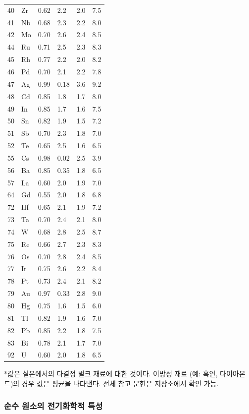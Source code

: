 \documentclass[12pt,a4paper]{article}
\begin{document}
\begin{longtable}{p{0.8cm}p{1.2cm}p{2.2cm}p{2.2cm}p{2.2cm}p{2.2cm}}
		40 & Zr & 0.62 & 2.2 & 2.0 & 7.5 \\
		41 & Nb & 0.68 & 2.3 & 2.2 & 8.0 \\
		42 & Mo & 0.70 & 2.6 & 2.4 & 8.5 \\
		44 & Ru & 0.71 & 2.5 & 2.3 & 8.3 \\
		45 & Rh & 0.77 & 2.2 & 2.0 & 8.2 \\
		46 & Pd & 0.70 & 2.1 & 2.2 & 7.8 \\
		47 & Ag & 0.99 & 0.18 & 3.6 & 9.2 \\
		48 & Cd & 0.85 & 1.8 & 1.7 & 8.0 \\
		49 & In & 0.85 & 1.7 & 1.6 & 7.5 \\
		50 & Sn & 0.82 & 1.9 & 1.5 & 7.2 \\
		51 & Sb & 0.70 & 2.3 & 1.8 & 7.0 \\
		52 & Te & 0.65 & 2.5 & 1.6 & 6.5 \\
		55 & Cs & 0.98 & 0.02 & 2.5 & 3.9 \\
		56 & Ba & 0.85 & 0.35 & 1.8 & 6.5 \\
		57 & La & 0.60 & 2.0 & 1.9 & 7.0 \\
		64 & Gd & 0.55 & 2.0 & 1.8 & 6.8 \\
		72 & Hf & 0.65 & 2.1 & 1.9 & 7.2 \\
		73 & Ta & 0.70 & 2.4 & 2.1 & 8.0 \\
		74 & W  & 0.68 & 2.8 & 2.5 & 8.7 \\
		75 & Re & 0.66 & 2.7 & 2.3 & 8.3 \\
		76 & Os & 0.70 & 2.8 & 2.4 & 8.5 \\
		77 & Ir & 0.75 & 2.6 & 2.2 & 8.4 \\
		78 & Pt & 0.73 & 2.4 & 2.1 & 8.2 \\
		79 & Au & 0.97 & 0.33 & 2.8 & 9.0 \\
		80 & Hg & 0.75 & 1.6 & 1.5 & 6.0 \\
		81 & Tl & 0.82 & 1.9 & 1.6 & 7.0 \\
		82 & Pb & 0.85 & 2.2 & 1.8 & 7.5 \\
		83 & Bi & 0.78 & 2.1 & 1.7 & 7.0 \\
		92 & U  & 0.60 & 2.0 & 1.8 & 6.5 \\
		\bottomrule
	\end{longtable}
	*값은 실온에서의 다결정 벌크 재료에 대한 것이다. 이방성 재료 (예: 흑연, 다이아몬드)의 경우 값은 평균을 나타낸다. 전체 참고 문헌은 저장소에서 확인 가능.
	
	\subsubsection{순수 원소의 전기화학적 특성}
	\label{subsec:electrochemical-properties-func}
	
\end{document}
